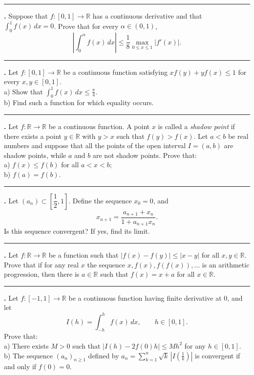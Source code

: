 \documentclass[11pt]{article}
\newcounter{probnum}
\newenvironment{problembox}{\par\noindent\rule{\linewidth}{0.5pt}\vspace{5pt}\par}{\vspace{2pt}}
\begin{document}
\begin{problembox}
\textbf{\theprobnum.} Suppose that $f : [0,1] \to \mathbb{R}$ has a continuous derivative and that $\displaystyle\int_0^1 f(x)\,dx = 0$. Prove that for every $\alpha \in (0,1)$,
\[
\left|\int_0^{\alpha} f(x)\,dx\right| \le \frac{1}{8} \max_{0 \le x \le 1} |f'(x)|.
\]
\end{problembox}

\begin{problembox}
\textbf{\theprobnum.} Let $f : [0,1] \to \mathbb{R}$ be a continuous function satisfying $x f(y) + y f(x) \le 1$ for every $x, y \in [0,1]$.\\
a) Show that $\displaystyle\int_0^1 f(x)\,dx \le \frac{\pi}{4}$.\\
b) Find such a function for which equality occurs.
\end{problembox}

\begin{problembox}
\textbf{\theprobnum.} Let $f : \mathbb{R} \to \mathbb{R}$ be a continuous function. A point $x$ is called a \emph{shadow point} if there exists a point $y \in \mathbb{R}$ with $y > x$ such that $f(y) > f(x)$. Let $a < b$ be real numbers and suppose that all the points of the open interval $I = (a,b)$ are shadow points, while $a$ and $b$ are not shadow points. Prove that:\\
a) $f(x) \le f(b)$ for all $a < x < b$;\\
b) $f(a) = f(b)$.
\end{problembox}

\begin{problembox}
\textbf{\theprobnum.} Let $(a_n) \subset \left[\dfrac{1}{2}, 1\right]$. Define the sequence $x_0 = 0$, and
\[
x_{n+1} = \frac{a_{n+1} + x_n}{1 + a_{n+1} x_n}.
\]
Is this sequence convergent? If yes, find its limit.
\end{problembox}

\begin{problembox}
\textbf{\theprobnum.} Let $f : \mathbb{R} \to \mathbb{R}$ be a function such that $|f(x) - f(y)| \le |x-y|$ for all $x, y \in \mathbb{R}$. Prove that if for any real $x$ the sequence $x, f(x), f(f(x)), \ldots$ is an arithmetic progression, then there is $a \in \mathbb{R}$ such that $f(x) = x + a$ for all $x \in \mathbb{R}$.
\end{problembox}

\begin{problembox}
\textbf{\theprobnum.} Let $f : [-1,1] \to \mathbb{R}$ be a continuous function having finite derivative at $0$, and let
\[
I(h) = \int_{-h}^{h} f(x)\,dx, \qquad h \in [0,1].
\]
Prove that:\\
a) There exists $M > 0$ such that $|I(h) - 2f(0)h| \le Mh^2$ for any $h \in [0,1]$.\\
b) The sequence $(a_n)_{n \ge 1}$ defined by $\displaystyle a_n = \sum_{k=1}^{n} \sqrt{k}\, \left|I\!\left(\frac{1}{k}\right)\right|$ is convergent if and only if $f(0) = 0$.
\end{problembox}
\end{document}
